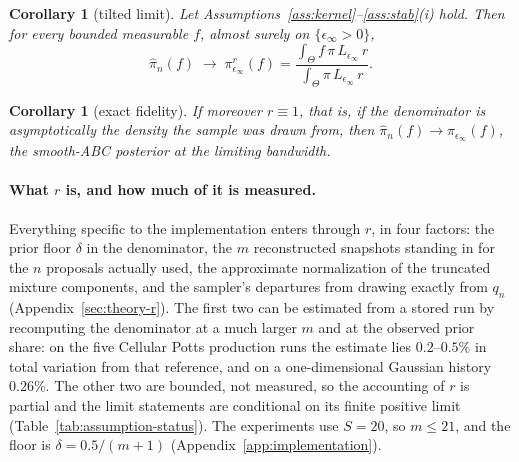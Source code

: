 \documentclass[10pt]{article}
\theoremstyle{plain}
\newtheorem{corollary}[theorem]{Corollary}
\theoremstyle{definition}
\begin{document}
\begin{corollary}[tilted limit]\label{cor:tilt}
Let Assumptions~\ref{ass:kernel}--\ref{ass:stab}(i) hold. Then for every bounded measurable $f$, almost surely on $\{\epsilon_\infty>0\}$,
\begin{equation}
\widehat\pi_n(f)\;\longrightarrow\;\pi^{r}_{\epsilon_\infty}(f)=\frac{\int_\Theta f\,\pi\,L_{\epsilon_\infty}\,r}{\int_\Theta \pi\,L_{\epsilon_\infty}\,r}.
\label{eq:tilted-target}
\end{equation}
\end{corollary}

\begin{corollary}[exact fidelity]\label{cor:exact}
If moreover $r\equiv1$, that is, if the denominator is asymptotically the density the sample was drawn from, then $\widehat\pi_n(f)\to\pi_{\epsilon_\infty}(f)$, the smooth-ABC posterior at the limiting bandwidth.
\end{corollary}

\paragraph{What $r$ is, and how much of it is measured.} Everything specific to the implementation enters through $r$, in four factors: the prior floor $\delta$ in the denominator, the $m$ reconstructed snapshots standing in for the $n$ proposals actually used, the approximate normalization of the truncated mixture components, and the sampler's departures from drawing exactly from $q_n$ (Appendix~\ref{sec:theory-r}). The first two can be estimated from a stored run by recomputing the denominator at a much larger $m$ and at the observed prior share: on the five Cellular Potts production runs the estimate lies $0.2$--$0.5\%$ in total variation from that reference, and on a one-dimensional Gaussian history $0.26\%$. The other two are bounded, not measured, so the accounting of $r$ is partial and the limit statements are conditional on its finite positive limit (Table~\ref{tab:assumption-status}). The experiments use $S=20$, so $m\le21$, and the floor is $\delta=0.5/(m{+}1)$ (Appendix~\ref{app:implementation}).
\end{document}
